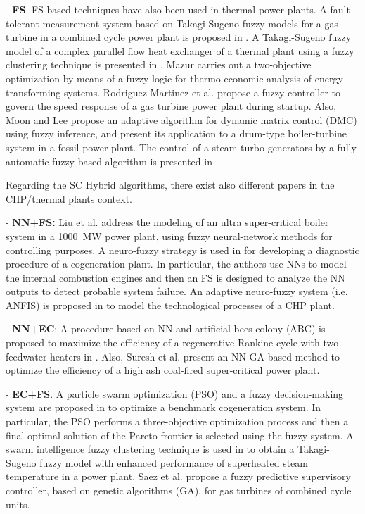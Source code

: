- \textbf{FS}. FS-based techniques have also been used in thermal power plants. A fault tolerant measurement system based on Takagi-Sugeno fuzzy models for a gas turbine in a combined cycle power plant is proposed in \cite{Berrios-2011}. A Takagi-Sugeno fuzzy model of a complex parallel flow heat exchanger of a thermal plant using a fuzzy clustering technique is presented in \cite{Habi-2011}. Mazur \cite{Mazur-2009} carries out a two-objective optimization by means of a fuzzy logic for thermo-economic analysis of energy-transforming systems. Rodriguez-Martinez et al. \cite{Rodriguez-Martinez-2011} propose a fuzzy controller to govern the speed response of a gas turbine power plant during startup. Also, Moon and Lee \cite{Moon-2011} propose an adaptive algorithm for dynamic matrix control (DMC) using fuzzy inference, and present its application to a drum-type boiler-turbine system in a fossil power plant. The control of a steam turbo-generators by a fully automatic fuzzy-based algorithm is presented in \cite{Gunes-2010}.

Regarding the SC Hybrid algorithms, there exist also different papers in the CHP/thermal plants context. 

- \textbf{NN+FS:} Liu et al. \cite{Liu2010} address the modeling of an ultra super-critical boiler system in a \SI{1000}{MW} power plant, using fuzzy neural-network methods for controlling purposes. A neuro-fuzzy strategy is used in \cite{Bare-2005} for developing a diagnostic procedure of a cogeneration plant. In particular, the authors use NNs to model the internal combustion engines and then an FS is designed to analyze the NN outputs to detect probable system failure. An adaptive neuro-fuzzy system (i.e. ANFIS) is proposed in \cite{Mastacan-2005} to model the technological processes of a CHP plant.

- \textbf{NN+EC}: A procedure based on NN and artificial bees colony (ABC) is proposed to maximize the efficiency of a regenerative Rankine cycle with two feedwater heaters in \cite{Rashidi-2011}. Also, Suresh et al. \cite{Suresh-2011} present an NN-GA based method to optimize the efficiency of a high ash coal-fired super-critical power plant.

- \textbf{EC+FS}. A particle swarm optimization (PSO) and a fuzzy decision-making system are proposed in \cite{Sayyaadi-2011} to optimize a benchmark cogeneration system. In particular, the PSO performs a three-objective optimization process and then a final optimal solution of the Pareto frontier is selected using the fuzzy system. A swarm intelligence fuzzy clustering technique is used in \cite{Su-12} to obtain a Takagi-Sugeno fuzzy model with enhanced performance of  superheated steam temperature in a power plant. Saez et al. \cite{Saez-2007} propose a fuzzy predictive supervisory controller, based on genetic algorithms (GA), for gas turbines of combined cycle units.

